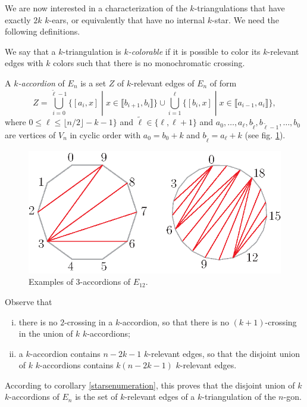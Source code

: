 \documentclass[12pt]{amsart}
\begin{document}
We are now interested in a characterization of the $k$-triangulations that have exactly $2k$ $k$-ears, or equivalently that have no internal $k$-star. We need the following definitions.

We say that a $k$-triangulation is \emph{$k$-colorable} if it is possible to color its $k$-relevant edges with $k$ colors such that there is no monochromatic crossing.

A \emph{$k$-accordion} of $E_n$ is a set $Z$ of $k$-relevant edges of $E_n$ of form
$$Z=\bigcup_{i=0}^{\tilde{\ell}-1} \{[a_i,x]\;|\;x\in\llbracket b_{i+1},b_i\rrbracket\} \cup \bigcup_{i=1}^{\ell} \{[b_i,x]\;|\;x\in\llbracket a_{i-1},a_i\rrbracket\},$$
where $0\le \ell\le\lfloor n/2\rfloor-k-1\}$ and $\tilde{\ell}\in\{\ell,\ell+1\}$ and $a_0,\ldots,a_\ell,b_{\tilde{\ell}},b_{\tilde{\ell}-1},\ldots,b_0$ are vertices of $V_n$ in cyclic order with $a_0=b_0+k$ and $b_{\tilde{\ell}}=a_\ell+k$ (see fig. \ref{accordion}).

\begin{figure}
\centerline{\includegraphics[scale=1]{accordion.eps}}
\caption{\small{Examples of $3$-accordions of $E_{12}$.}}\label{accordion}
\end{figure}

Observe that
\begin{enumerate}[(i)]
\item there is no $2$-crossing in a $k$-accordion, so that there is no $(k+1)$-crossing in the union of $k$ $k$-accordions;
\item a $k$-accordion contains $n-2k-1$ $k$-relevant edges, so that the disjoint union of $k$ $k$-accordions contains $k(n-2k-1)$ $k$-relevant edges.
\end{enumerate}
According to corollary \ref{starsenumeration}, this proves that the disjoint union of $k$ $k$-accordions of $E_n$ is the set of $k$-relevant edges of a $k$-triangulation of the $n$-gon.
\end{document}
